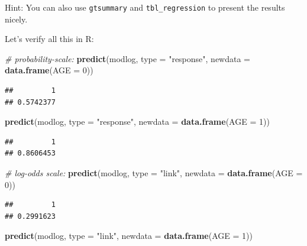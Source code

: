 \documentclass[
]{article}
\newenvironment{Shaded}{\begin{snugshade}}{\end{snugshade}}
\newcommand{\AttributeTok}[1]{\textcolor[rgb]{0.13,0.29,0.53}{#1}}
\newcommand{\CommentTok}[1]{\textcolor[rgb]{0.56,0.35,0.01}{\textit{#1}}}
\newcommand{\DecValTok}[1]{\textcolor[rgb]{0.00,0.00,0.81}{#1}}
\newcommand{\FunctionTok}[1]{\textcolor[rgb]{0.13,0.29,0.53}{\textbf{#1}}}
\newcommand{\NormalTok}[1]{#1}
\newcommand{\StringTok}[1]{\textcolor[rgb]{0.31,0.60,0.02}{#1}}
\begin{document}
Hint: You can also use \texttt{gtsummary} and \texttt{tbl\_regression}
to present the results nicely.

Let's verify all this in R:

\begin{Shaded}
\begin{Highlighting}[]
\CommentTok{\# probability{-}scale:}
\FunctionTok{predict}\NormalTok{(modlog, }\AttributeTok{type =} \StringTok{"response"}\NormalTok{,}
        \AttributeTok{newdata =} \FunctionTok{data.frame}\NormalTok{(}\AttributeTok{AGE =} \DecValTok{0}\NormalTok{))}
\end{Highlighting}
\end{Shaded}

\begin{verbatim}
##         1 
## 0.5742377
\end{verbatim}

\begin{Shaded}
\begin{Highlighting}[]
\FunctionTok{predict}\NormalTok{(modlog, }\AttributeTok{type =} \StringTok{"response"}\NormalTok{,}
        \AttributeTok{newdata =} \FunctionTok{data.frame}\NormalTok{(}\AttributeTok{AGE =} \DecValTok{1}\NormalTok{))}
\end{Highlighting}
\end{Shaded}

\begin{verbatim}
##         1 
## 0.8606453
\end{verbatim}

\begin{Shaded}
\begin{Highlighting}[]
\CommentTok{\# log{-}odds scale:}
\FunctionTok{predict}\NormalTok{(modlog, }\AttributeTok{type =} \StringTok{"link"}\NormalTok{,}
        \AttributeTok{newdata =} \FunctionTok{data.frame}\NormalTok{(}\AttributeTok{AGE =} \DecValTok{0}\NormalTok{))}
\end{Highlighting}
\end{Shaded}

\begin{verbatim}
##         1 
## 0.2991623
\end{verbatim}

\begin{Shaded}
\begin{Highlighting}[]
\FunctionTok{predict}\NormalTok{(modlog, }\AttributeTok{type =} \StringTok{"link"}\NormalTok{,}
        \AttributeTok{newdata =} \FunctionTok{data.frame}\NormalTok{(}\AttributeTok{AGE =} \DecValTok{1}\NormalTok{))}
\end{Highlighting}
\end{Shaded}
\end{document}
